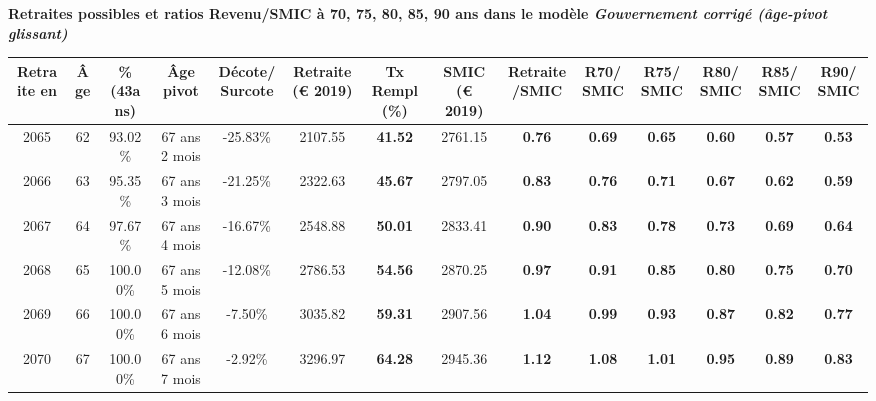  \vspace{0.1cm} 
{\bf \noindent Retraites possibles et ratios Revenu/SMIC à 70, 75, 80, 85, 90 ans dans le modèle \emph{Gouvernement corrigé (âge-pivot glissant)}}  
 
\begin{adjustbox}{max width=\textwidth} 
\begin{tabular}[htb]{|c|c||c|c|c||c|c||c|c||c|c|c|c|c|} 
\hline 
 Retraite en &  Âge &  \%(43ans) &  Âge pivot &  Décote/Surcote &  Retraite (\euro{} 2019) &  Tx Rempl(\%) &  SMIC (\euro{} 2019) &  Retraite/SMIC &  R70/SMIC &  R75/SMIC &  R80/SMIC &  R85/SMIC &  R90/SMIC \\ 
\hline \hline 
 2065 &  62 &  93.02\% &  67 ans 2 mois &  -25.83\% &  2107.55 &  {\bf 41.52} &  2761.15 &  {\bf {\color{red} 0.76}} &  {\bf {\color{red} 0.69}} &  {\bf {\color{red} 0.65}} &  {\bf {\color{red} 0.60}} &  {\bf {\color{red} 0.57}} &  {\bf {\color{red} 0.53}} \\ 
\hline 
 2066 &  63 &  95.35\% &  67 ans 3 mois &  -21.25\% &  2322.63 &  {\bf 45.67} &  2797.05 &  {\bf {\color{red} 0.83}} &  {\bf {\color{red} 0.76}} &  {\bf {\color{red} 0.71}} &  {\bf {\color{red} 0.67}} &  {\bf {\color{red} 0.62}} &  {\bf {\color{red} 0.59}} \\ 
\hline 
 2067 &  64 &  97.67\% &  67 ans 4 mois &  -16.67\% &  2548.88 &  {\bf 50.01} &  2833.41 &  {\bf {\color{red} 0.90}} &  {\bf {\color{red} 0.83}} &  {\bf {\color{red} 0.78}} &  {\bf {\color{red} 0.73}} &  {\bf {\color{red} 0.69}} &  {\bf {\color{red} 0.64}} \\ 
\hline 
 2068 &  65 &  100.00\% &  67 ans 5 mois &  -12.08\% &  2786.53 &  {\bf 54.56} &  2870.25 &  {\bf {\color{red} 0.97}} &  {\bf {\color{red} 0.91}} &  {\bf {\color{red} 0.85}} &  {\bf {\color{red} 0.80}} &  {\bf {\color{red} 0.75}} &  {\bf {\color{red} 0.70}} \\ 
\hline 
 2069 &  66 &  100.00\% &  67 ans 6 mois &  -7.50\% &  3035.82 &  {\bf 59.31} &  2907.56 &  {\bf 1.04} &  {\bf {\color{red} 0.99}} &  {\bf {\color{red} 0.93}} &  {\bf {\color{red} 0.87}} &  {\bf {\color{red} 0.82}} &  {\bf {\color{red} 0.77}} \\ 
\hline 
 2070 &  67 &  100.00\% &  67 ans 7 mois &  -2.92\% &  3296.97 &  {\bf 64.28} &  2945.36 &  {\bf 1.12} &  {\bf 1.08} &  {\bf 1.01} &  {\bf {\color{red} 0.95}} &  {\bf {\color{red} 0.89}} &  {\bf {\color{red} 0.83}} \\ 
\hline 
\hline 
\end{tabular} 
\end{adjustbox} 
 
